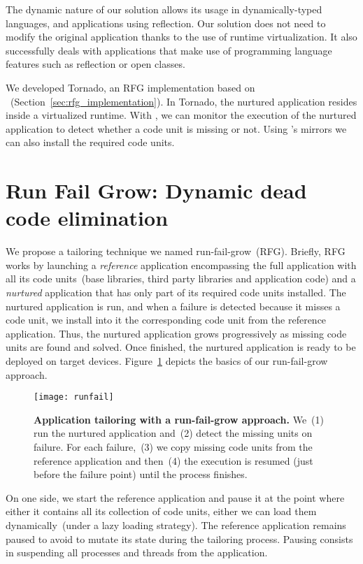 The dynamic nature of our solution allows its usage in dynamically-typed languages, and applications using reflection. Our solution does not need to modify the original application thanks to the use of \Vtt runtime virtualization.
It also successfully deals with applications that make use of programming language features such as reflection or open classes.

We developed Tornado, an RFG implementation based on \Vtt~(Section~\ref{sec:rfg_implementation}). In Tornado, the nurtured application resides inside a virtualized runtime. With \Vtt, we can monitor the execution of the nurtured application to detect whether a code unit is missing or not. Using \Vtt's mirrors we can also install the required code units.

\section{Run Fail Grow: Dynamic dead code elimination}\label{sec:rfg_model}

We propose a tailoring technique we named run-fail-grow~(RFG). Briefly, RFG works by launching a \emph{reference} application encompassing the full application with all its code units~(base libraries, third party libraries and application code) and a \emph{nurtured} application that has only part of its required code units installed. The nurtured application is run, and when a failure is detected because it misses a code unit, we install into it the corresponding code unit from the reference application. Thus, the nurtured application grows progressively as missing code units are found and solved.
Once finished, the nurtured application is ready to be deployed on target devices. Figure~\ref{fig:runfail} depicts the basics of our run-fail-grow approach.

\begin{figure}[ht]
\begin{center}
\texttt{[image: runfail]}
\caption{\small \textbf{Application tailoring with a run-fail-grow approach.} We~(1) run the nurtured application and~(2) detect the missing units on failure. For each failure,~(3) we copy missing code units from the reference application and then~(4) the execution is resumed (just before the failure point) until the process finishes. \label{fig:runfail}}
\end{center}
\end{figure}

On one side, we start the reference application and pause it at the point where either it contains all its collection of code units, either we can load them dynamically~(under a lazy loading strategy). The reference application remains paused to avoid to mutate its state during the tailoring process. Pausing consists in suspending all processes and threads from the application.


